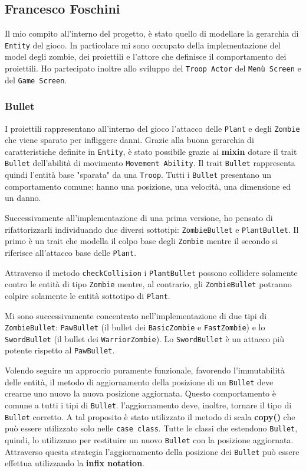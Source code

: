 


\subsection{Francesco Foschini}
Il mio compito all'interno del progetto, è stato quello di modellare la gerarchia di \texttt{Entity} del gioco.
In particolare mi sono occupato della implementazione del model degli zombie, dei proiettili e l'attore che definisce il comportamento dei proiettili.
Ho partecipato inoltre allo sviluppo del \texttt{Troop Actor} del \texttt{Menù Screen} e del \texttt{Game Screen}.

\subsubsection{Bullet}
I proiettili rappresentano all'interno del gioco l'attacco delle \texttt{Plant} e degli \texttt{Zombie} che viene sparato
per infliggere danni. Grazie alla buona gerarchia di caratteristiche definite in \texttt{Entity}, è stato possibile grazie  ai \textbf{mixin}
dotare il trait \texttt{Bullet} dell'abilità di movimento \texttt{Movement Ability}.
Il trait \texttt{Bullet} rappresenta quindi l'entità base "sparata" da una \texttt{Troop}.
Tutti i \texttt{Bullet} presentano un comportamento comune: hanno una posizione, una velocità, una dimensione ed un danno.


Successivamente all'implementazione di una prima versione, ho pensato di rifattorizzarli individuando due diversi sottotipi: \texttt{ZombieBullet} e \texttt{PlantBullet}.
Il primo è un trait che modella il colpo base degli \texttt{Zombie} mentre il secondo si riferisce all'attacco base delle \texttt{Plant}.

Attraverso il metodo \texttt{checkCollision} i \texttt{PlantBullet} possono collidere solamente contro le entità di tipo \texttt{Zombie} mentre,
al contrario, gli \texttt{ZombieBullet} potranno colpire solamente le entità sottotipo di \texttt{Plant}.

Mi sono successivamente concentrato nell'implementazione di due tipi di \texttt{ZombieBullet}: \texttt{PawBullet} (il bullet dei
\texttt{BasicZombie} e \texttt{FastZombie}) e lo \texttt{SwordBullet} (il bullet dei \texttt{WarriorZombie}).
Lo \texttt{SwordBullet} è un attacco più potente rispetto al \texttt{PawBullet}.

Volendo seguire un approccio puramente funzionale, favorendo l'immutabilità delle entità, il metodo di
aggiornamento della posizione di un \texttt{Bullet} deve crearne uno nuovo la nuova posizione aggiornata.
Questo comportamento è comune a tutti i tipi di \texttt{Bullet}. l'aggiornamento deve, inoltre,
tornare il tipo di \texttt{Bullet} corretto. A tal proposito è stato utilizzato il metodo di scala  \textbf{copy()} che può essere utilizzato solo nelle \texttt{case class}. Tutte le classi che estendono
\texttt{Bullet}, quindi, lo utilizzano per restituire un nuovo \texttt{Bullet} con la posizione aggiornata.
Attraverso questa strategia l'aggiornamento della posizione dei \texttt{Bullet} può essere effettua utilizzando la \textbf{infix notation}.

